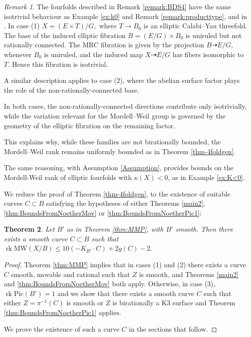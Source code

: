 \documentclass[11pt]{amsart}
\newtheorem{theorem}{Theorem}[section]
\theoremstyle{definition}
\theoremstyle{definition}
\theoremstyle{remark}
\newtheorem{remark}[theorem]{Remark}
\theoremstyle{remark}
\theoremstyle{definition}
\theoremstyle{conjecture}
\newcommand{\MW}{\mathrm{MW}}
\newcommand{\Pic}{\mathrm{Pic}}
\begin{document}
\smallskip


\begin{remark} 
The fourfolds described in Remark  \ref{remark:BDS4} have the same isotrivial behaviour as  Example \ref{ex:k0}  and Remark \ref{remark:producttype}, and in \cite{Birkar_2024}. In case (1) 
$
X = (E \times T)/G,
$
where $T \to B_0$ is an elliptic Calabi{--}Yau threefold. The base of the induced elliptic fibration 
$
B = (E/G) \times B_0
$
 is uniruled but not rationally connected. The MRC fibration is given by the projection
$B \dashrightarrow E/G,$  whenever $B_0$ is uniruled,
and the induced map
$X \dashrightarrow E/G$
has fibers isomorphic to $T$. Hence this fibration is isotrivial.

A similar description applies to case (2), where the abelian surface factor plays the role of the non-rationally-connected base. 

In both cases, the non-rationally-connected directions contribute only isotrivially, while the variation relevant for the Mordell{--}Weil group is governed by the geometry of the elliptic fibration on the remaining factor.

This explains why, while these families are not birationally bounded,  the Mordell{--}Weil rank remains uniformly bounded as in Theorem \ref{thm-4foldgen}.
\end{remark}


The same reasoning, with Assumption \ref{Assumption}, provides bounds on the Mordell-Weil rank of elliptic fourfolds with
$\kappa(X) <0$, as in Example \ref{ex:K<0}.

\vskip 0.2in

We reduce the proof of  Theorem \ref{thm-4foldgen}, to the existence of suitable curves $C \subset B$ satisfying the hypotheses of  either Theorems \ref{main2}, \ref{thm:BoundsFromNoetherMov} or \ref{thm:BoundsFromNoetherPic1}:

\begin{theorem} \label{them-existencecurve} Let $B'$  as in Theorem \ref{thm:MMP}, with $B'$ smooth. Then there exists a smooth curve $C \subset B$ such that 
	$\operatorname{rk} \MW(X/B) \leq 10 (-K_{B'} \cdot C ) +2 g(C) -2.$

   
\end{theorem}

\begin{proof} 
Theorem \ref{thm:MMP} implies that in cases (1) and (2) there exists a curve $C$ smooth, movable and rational  such that  $Z$ is smooth, and  Theorems \ref{main2}  and \ref{thm:BoundsFromNoetherMov} both apply. 
Otherwise, in case (3), $\operatorname{rk} \Pic (B')=1$ and we show that there exists a smooth curve $C$  such that either $Z=\pi^{-1}(C)$ is smooth  or $Z$ is birationally a K3 surface and  Theorem \ref{thm:BoundsFromNoetherPic1}  applies.

We prove the existence of such a  curve $C$ in the  sections that follow.
\end{proof}
\end{document}

